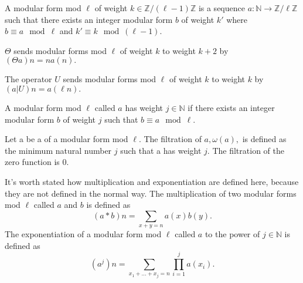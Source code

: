 \begin{definition} 
  \label{def:ModularFormMod}
  \leanok
  A modular form mod $\ell$ of weight $k \in \mathbb{Z} / (\ell - 1) \mathbb{Z}$ is a sequence $a : \mathbb{N} → \mathbb{Z} / \ell \mathbb{Z}$
  such that there exists an integer modular form $b$ of weight $k'$ where
  $b \equiv a \mod \ell$ and $k' \equiv k \mod (\ell - 1)$.
\end{definition}


\begin{definition} [Theta]
  \label{def:Theta}
  \leanok
  $\Theta$ sends modular forms mod $\ell$ of weight $k$ to weight $k + 2$ by \\
  $(\Theta a) n = n a(n).$

\end{definition}

\begin{definition} [U Operator]
  \label{def:U_Operator}
  \leanok
  The operator $U$ sends modular forms mod $\ell$ of weight $k$ to weight $k$ by \\
  $ (a|U) n = a(\ell n).$
\end{definition}

\begin{definition} [hasWeight]
  \label{def:hasWeight}
  \leanok
  A modular form mod $\ell$ called $a$ has weight $j \in \mathbb{N}$ if
  there exists an integer modular form $b$ of weight $j$ such that $b \equiv a \mod \ell$.
\end{definition}

\begin{definition} [Filtration]
  \label{def:Filtration}
  \leanok
  Let a be a of a modular form mod $\ell$. The filtration of $a, \omega (a), $ 
  is defined as the minimum natural number $j$ such that a has weight $j$. 
  The filtration of the zero function is $0$.
\end{definition}

\begin{definition} 
  \label{def:mulpow}
  \leanok
  It's worth stated how multiplication and exponentiation are defined here, because they are not defined in the normal way.
  The multiplication of two modular forms mod $\ell$ called $a$ and $b$ is defined as 
  \[(a * b) n = \sum_{x + y = n} a(x) b(y).\] 
  The exponentiation of a modular form mod $\ell$ called $a$ to the power of $j \in \mathbb{N}$ is defined as 
  \[(a^j) n = \sum_ {x_1 + ... + x_j = n} \prod_{i = 1}^j a (x_i).\]
\end{definition}



